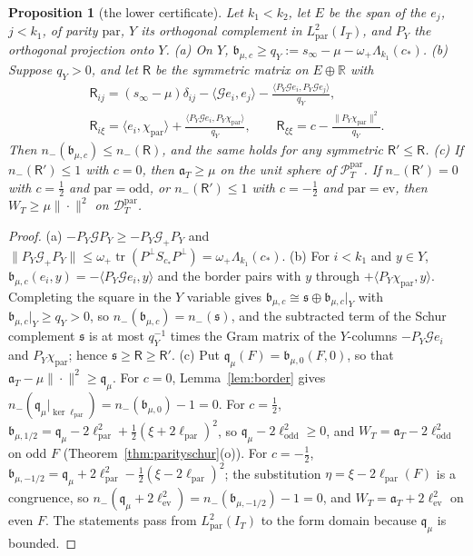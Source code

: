 \documentclass[11pt]{amsart}
\newtheorem{proposition}[theorem]{Proposition}
\theoremstyle{definition}
\theoremstyle{remark}
\newcommand{\R}{\mathbb R}
\newcommand{\PT}{\mathcal P_T}
\newcommand{\IT}{I_T}
\begin{document}
\begin{proposition}[the lower certificate]\label{prop:lowercert}
Let $k_1<k_2$, let $E$ be the span of the $e_j$, $j<k_1$, of parity $\mathrm{par}$, $Y$ its orthogonal
complement in $L^2_{\mathrm{par}}(\IT)$, and $P_Y$ the orthogonal projection onto $Y$.
\emph{(a)} On $Y$, $\mathfrak b_{\mu,c}\ge q_Y:=s_\infty-\mu-\omega_+\Lambda_{k_1}(c_*)$.
\emph{(b)} Suppose $q_Y>0$, and let $\mathsf R$ be the symmetric matrix on $E\oplus\R$ with
\[
\begin{gathered}
\mathsf R_{ij}=(s_\infty-\mu)\delta_{ij}-\langle\mathcal Ge_i,e_j\rangle
-\frac{\langle P_Y\mathcal Ge_i,P_Y\mathcal Ge_j\rangle}{q_Y},\\
\mathsf R_{i\xi}=\langle e_i,\chi_{\mathrm{par}}\rangle+\frac{\langle P_Y\mathcal Ge_i,P_Y\chi_{\mathrm{par}}\rangle}{q_Y},\qquad
\mathsf R_{\xi\xi}=c-\frac{\|P_Y\chi_{\mathrm{par}}\|^2}{q_Y}.
\end{gathered}
\]
Then $n_-(\mathfrak b_{\mu,c})\le n_-(\mathsf R)$, and the same holds for any symmetric $\mathsf R'\le\mathsf R$.
\emph{(c)} If $n_-(\mathsf R')\le1$ with $c=0$, then $\mathfrak a_T\ge\mu$ on the unit sphere of
$\PT^{\mathrm{par}}$. If $n_-(\mathsf R')=0$ with $c=\frac12$ and $\mathrm{par}=\mathrm{odd}$, or $n_-(\mathsf R')\le1$ with
$c=-\frac12$ and $\mathrm{par}=\mathrm{ev}$, then $W_T\ge\mu\|\cdot\|^2$ on $\mathcal D^{\mathrm{par}}_T$.
\end{proposition}
\begin{proof}\sloppy
(a) $-P_Y\mathcal GP_Y\ge-P_Y\mathcal G_+P_Y$ and
$\|P_Y\mathcal G_+P_Y\|\le\omega_+\operatorname{tr}(P^\perp S_{c_*}P^\perp)=\omega_+\Lambda_{k_1}(c_*)$.
(b) For $i<k_1$ and $y\in Y$, $\mathfrak b_{\mu,c}(e_i,y)=-\langle P_Y\mathcal Ge_i,y\rangle$ and the border pairs
with $y$ through $+\langle P_Y\chi_{\mathrm{par}},y\rangle$. Completing the square in the $Y$ variable gives $\mathfrak b_{\mu,c}\cong\mathfrak s\oplus\mathfrak b_{\mu,c}|_Y$ with
$\mathfrak b_{\mu,c}|_Y\ge q_Y>0$, so $n_-(\mathfrak b_{\mu,c})=n_-(\mathfrak s)$, and the subtracted term of the Schur
complement $\mathfrak s$ is at most $q_Y^{-1}$ times the Gram matrix of the $Y$-columns
$-P_Y\mathcal Ge_i$ and $P_Y\chi_{\mathrm{par}}$; hence $\mathfrak s\ge\mathsf R\ge\mathsf R'$.
(c) Put $\mathfrak q_\mu(F)=\mathfrak b_{\mu,0}(F,0)$, so that $\mathfrak a_T-\mu\|\cdot\|^2\ge\mathfrak q_\mu$. For
$c=0$, Lemma~\ref{lem:border} gives $n_-(\mathfrak q_\mu|_{\ker\ell_{\mathrm{par}}})=n_-(\mathfrak b_{\mu,0})-1=0$. For
$c=\frac12$, $\mathfrak b_{\mu,1/2}=\mathfrak q_\mu-2\ell_{\mathrm{par}}^2+\frac12(\xi+2\ell_{\mathrm{par}})^2$, so
$\mathfrak q_\mu-2\ell_{\mathrm{odd}}^2\ge0$, and $W_T=\mathfrak a_T-2\ell_{\mathrm{odd}}^2$ on odd $F$
(Theorem~\ref{thm:parityschur}(o)). For $c=-\frac12$,
$\mathfrak b_{\mu,-1/2}=\mathfrak q_\mu+2\ell_{\mathrm{par}}^2-\frac12(\xi-2\ell_{\mathrm{par}})^2$; the substitution
$\eta=\xi-2\ell_{\mathrm{par}}(F)$ is a congruence, so
$n_-(\mathfrak q_\mu+2\ell_{\mathrm{ev}}^2)=n_-(\mathfrak b_{\mu,-1/2})-1=0$, and $W_T=\mathfrak a_T+2\ell_{\mathrm{ev}}^2$ on even
$F$. The statements pass from $L^2_{\mathrm{par}}(\IT)$ to the form domain because $\mathfrak q_\mu$ is bounded.
\end{proof}
\end{document}
